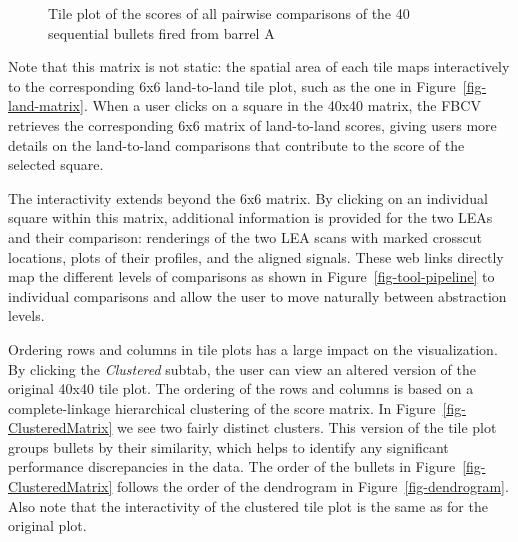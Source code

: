 \documentclass[
  12pt]{article}
\begin{document}
\begin{figure}


\caption{\label{fig-barrel-matrix}Tile plot of the scores of all
pairwise comparisons of the 40 sequential bullets fired from barrel A}

\end{figure}%

Note that this matrix is not static: the spatial area of each tile maps
interactively to the corresponding 6x6 land-to-land tile plot, such as
the one in Figure~\ref{fig-land-matrix}. When a user clicks on a square
in the 40x40 matrix, the FBCV retrieves the corresponding 6x6 matrix of
land-to-land scores, giving users more details on the land-to-land
comparisons that contribute to the score of the selected square.

The interactivity extends beyond the 6x6 matrix. By clicking on an
individual square within this matrix, additional information is provided
for the two LEAs and their comparison: renderings of the two LEA scans
with marked crosscut locations, plots of their profiles, and the aligned
signals. These web links directly map the different levels of
comparisons as shown in Figure~\ref{fig-tool-pipeline} to individual
comparisons and allow the user to move naturally between abstraction
levels.

Ordering rows and columns in tile plots has a large impact on the
visualization. By clicking the \emph{Clustered} subtab, the user can
view an altered version of the original 40x40 tile plot. The ordering of
the rows and columns is based on a complete-linkage hierarchical
clustering of the score matrix. In Figure~\ref{fig-ClusteredMatrix} we
see two fairly distinct clusters. This version of the tile plot groups
bullets by their similarity, which helps to identify any significant
performance discrepancies in the data. The order of the bullets in
Figure~\ref{fig-ClusteredMatrix} follows the order of the dendrogram in
Figure~\ref{fig-dendrogram}. Also note that the interactivity of the
clustered tile plot is the same as for the original plot.
\end{document}

